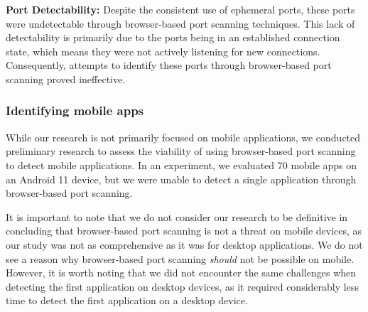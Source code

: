 \textbf{Port Detectability:} Despite the consistent use of ephemeral ports, these ports were undetectable through browser-based port scanning techniques. This lack of detectability is primarily due to the ports being in an established connection state, which means they were not actively listening for new connections. Consequently, attempts to identify these ports through browser-based port scanning proved ineffective.

\subsubsection{Identifying mobile apps}

While our research is not primarily focused on mobile applications, we conducted preliminary research to assess the viability of using browser-based port scanning to detect mobile applications. In an experiment, we evaluated 70 mobile apps on an Android 11 device, but we were unable to detect a single application through browser-based port scanning. 

It is important to note that we do not consider our research to be definitive in concluding that browser-based port scanning is not a threat on mobile devices, as our study was not as comprehensive as it was for desktop applications. We do not see a reason why browser-based port scanning \emph{should} not be possible on mobile. However, it is worth noting that we did not encounter the same challenges when detecting the first application on desktop devices, as it required considerably less time to detect the first application on a desktop device.




